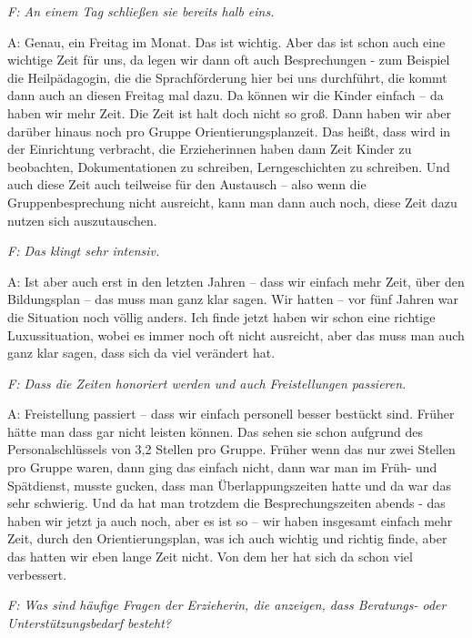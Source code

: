 \begin{linenumbers*}
\emph{F: An einem Tag schließen sie bereits halb eins.} 

A: Genau, ein Freitag im Monat. Das ist wichtig. Aber das ist schon auch eine wichtige Zeit für uns, da legen wir dann oft auch Besprechungen - zum Beispiel die Heilpädagogin, die die Sprachförderung hier bei uns durchführt, die kommt dann auch an diesen Freitag mal dazu. Da können wir die Kinder einfach – da haben wir mehr Zeit. Die Zeit ist halt doch nicht so groß. Dann haben wir aber darüber hinaus noch pro Gruppe Orientierungsplanzeit. Das heißt, dass wird in der Einrichtung verbracht, die Erzieherinnen haben dann Zeit Kinder zu beobachten, Dokumentationen zu schreiben, Lerngeschichten zu schreiben. Und auch diese Zeit auch teilweise für den Austausch – also wenn die Gruppenbesprechung nicht ausreicht, kann man dann auch noch, diese Zeit dazu nutzen sich auszutauschen. 

\emph{F: Das klingt sehr intensiv.}

A: Ist aber auch erst in den letzten Jahren – dass wir einfach mehr Zeit, über den Bildungsplan – das muss man ganz klar sagen. Wir hatten – vor fünf Jahren war die Situation noch völlig anders. Ich finde jetzt haben wir schon eine richtige Luxussituation, wobei es immer noch oft nicht ausreicht, aber das muss man auch ganz klar sagen, dass sich da viel verändert hat.

\emph{F: Dass die Zeiten honoriert werden und auch Freistellungen passieren.}

A: Freistellung passiert – dass wir einfach personell besser bestückt sind. Früher hätte man dass gar nicht leisten können. Das sehen sie schon aufgrund des Personalschlüssels von 3,2 Stellen pro Gruppe. Früher wenn das nur zwei Stellen pro Gruppe waren, dann ging das einfach nicht, dann war man im Früh- und Spätdienst, musste gucken, dass man Überlappungszeiten hatte und da war das sehr schwierig. Und da hat man trotzdem die Besprechungszeiten abends  - das haben wir jetzt ja auch noch, aber es ist so – wir haben insgesamt einfach mehr Zeit, durch den Orientierungsplan, was ich auch wichtig und richtig finde, aber das hatten wir eben lange Zeit nicht. Von dem her hat sich da schon viel verbessert. 

\emph{F: Was sind häufige Fragen der Erzieherin, die anzeigen, dass Beratungs- oder Unterstützungsbedarf besteht?}


\end{linenumbers*}
